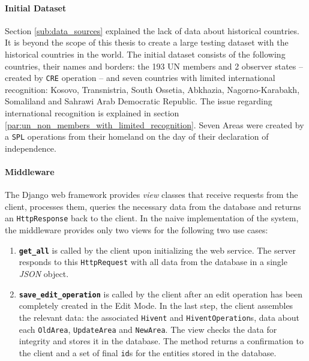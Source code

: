 \paragraph{Initial Dataset} %
\label{par:initial_dataset}

Section \ref{sub:data_sources} explained the lack of data about historical countries. It is beyond the scope of this thesis to create a large testing dataset with the historical countries in the world. The initial dataset consists of the following countries, their names and borders: the 193 UN members and 2 observer states -- created by \texttt{CRE} operation -- and seven countries with limited international recognition: Kosovo, Transnistria, South Ossetia, Abkhazia, Nagorno-Karabakh, Somaliland and Sahrawi Arab Democratic Republic. The issue regarding international recognition is explained in section \ref{par:un_non_members_with_limited_recognition}. Seven Areas were created by a \texttt{SPL} operations from their homeland on the day of their declaration of independence.


\paragraph{Middleware} %
\label{par:middleware}

The Django web framework provides \emph{view} classes that receive requests from the client, processes them, queries the necessary data from the database and returns an \texttt{HttpResponse} back to the client. In the naive implementation of the system, the middleware provides only two views for the following two use cases:

\begin{enumerate}
  \item \textbf{\texttt{get\_all}} is called by the client upon initializing the web service. The server responds to this \texttt{HttpRequest} with all data from the database in a single \emph{JSON} object.
  \item \textbf{\texttt{save\_edit\_operation}} is called by the client after an edit operation has been completely created in the Edit Mode. In the last step, the client assembles the relevant data: the associated \texttt{Hivent} and \texttt{HiventOperation}s, data about each \texttt{OldArea}, \texttt{UpdateArea} and \texttt{NewArea}. The view checks the data for integrity and stores it in the database. The method returns a confirmation to the client and a set of final \texttt{id}s for the entities stored in the database.
\end{enumerate}

